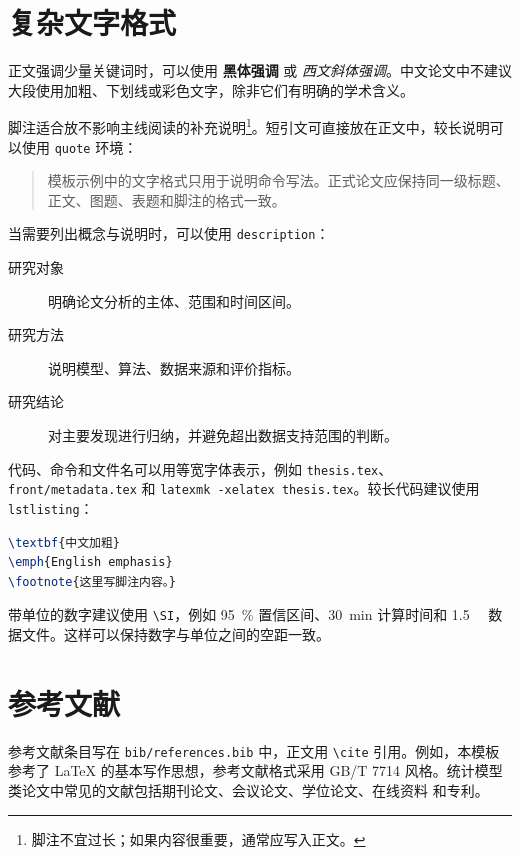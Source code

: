 \section{复杂文字格式}

正文强调少量关键词时，可以使用 \textbf{黑体强调} 或 \emph{西文斜体强调}。中文论文中不建议大段使用加粗、下划线或彩色文字，除非它们有明确的学术含义。

脚注适合放不影响主线阅读的补充说明\footnote{脚注不宜过长；如果内容很重要，通常应写入正文。}。短引文可直接放在正文中，较长说明可以使用 \texttt{quote} 环境：

\begin{quote}
模板示例中的文字格式只用于说明命令写法。正式论文应保持同一级标题、正文、图题、表题和脚注的格式一致。
\end{quote}

当需要列出概念与说明时，可以使用 \texttt{description}：

\begin{description}
  \item[研究对象] 明确论文分析的主体、范围和时间区间。
  \item[研究方法] 说明模型、算法、数据来源和评价指标。
  \item[研究结论] 对主要发现进行归纳，并避免超出数据支持范围的判断。
\end{description}

代码、命令和文件名可以用等宽字体表示，例如 \texttt{thesis.tex}、\texttt{front/metadata.tex} 和 \verb|latexmk -xelatex thesis.tex|。较长代码建议使用 \texttt{lstlisting}：

\begin{lstlisting}[language=TeX]
\textbf{中文加粗}
\emph{English emphasis}
\footnote{这里写脚注内容。}
\end{lstlisting}

带单位的数字建议使用 \verb|\SI|，例如 \SI{95}{\percent} 置信区间、\SI{30}{\minute} 计算时间和 \SI{1.5}{\giga\byte} 数据文件。这样可以保持数字与单位之间的空距一致。

\section{参考文献}

参考文献条目写在 \texttt{bib/references.bib} 中，正文用 \verb|\cite| 引用。例如，本模板参考了 \LaTeX{} 的基本写作思想\cite{lamport1986latex}，参考文献格式采用 GB/T 7714 风格\cite{gbt7714-2015}。统计模型类论文中常见的文献包括期刊论文\cite{wang2026robust}、会议论文\cite{he2016resnet}、学位论文\cite{li2024thesis}、在线资料\cite{ctan2026biblatex} 和专利\cite{sample-patent}。

